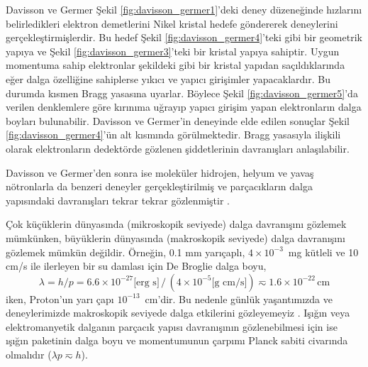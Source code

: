 \documentclass[a4paper,12pt, twoside]{article}
\begin{document}
Davisson ve Germer Şekil \ref{fig:davisson_germer1}'deki deney düzeneğinde hızlarını belirledikleri elektron demetlerini Nikel kristal hedefe göndererek deneylerini gerçekleştirmişlerdir. Bu hedef Şekil \ref{fig:davisson_germer4}'teki gibi bir geometrik yapıya ve Şekil \ref{fig:davisson_germer3}'teki bir kristal yapıya sahiptir. Uygun momentuma sahip elektronlar şekildeki gibi bir kristal yapıdan saçıldıklarında eğer dalga özelliğine sahiplerse yıkıcı ve yapıcı girişimler yapacaklardır. Bu durumda kısmen Bragg yasasına uyarlar. Böylece Şekil \ref{fig:davisson_germer5}'da verilen denklemlere göre kırınıma uğrayıp yapıcı girişim yapan elektronların dalga boyları bulunabilir. Davisson ve Germer'in deneyinde elde edilen sonuçlar Şekil \ref{fig:davisson_germer4}'ün alt kısmında görülmektedir. Bragg yasasıyla ilişkili olarak elektronların dedektörde gözlenen şiddetlerinin davranışları anlaşılabilir.

Davisson ve Germer'den sonra ise moleküler hidrojen, helyum ve yavaş nötronlarla da benzeri deneyler gerçekleştirilmiş ve parçacıkların dalga yapısındaki davranışları tekrar tekrar gözlenmiştir \cite{book:Gasiorowicz}.

Çok küçüklerin dünyasında (mikroskopik seviyede) dalga davranışını gözlemek mümkünken, büyüklerin dünyasında (makroskopik seviyede) dalga davranışını gözlemek mümkün değildir. Örneğin, 0.1 mm yarıçaplı, $4\times 10^{-3}$~mg kütleli ve 10 cm/s ile ilerleyen bir su damlası için De Broglie dalga boyu,
\begin{equation*}
\lambda = h/p = 6.6\times 10^{-27} \text{[erg s]}\,/\,(4\times 10^{-5} \text{[g cm/s]}) \eqsim 1.6\times 10^{-22}\,\text{cm}
\end{equation*}
iken, Proton'un yarı çapı $10^{-13}$~cm'dir. Bu nedenle günlük yaşantımızda ve deneylerimizde makroskopik seviyede dalga etkilerini gözleyemeyiz \cite{book:Gasiorowicz}. Işığın veya elektromanyetik dalganın parçacık yapısı davranışının gözlenebilmesi için ise ışığın paketinin dalga boyu ve momentumunun çarpımı Planck sabiti civarında olmalıdır ($\lambda p \eqsim h$).
\end{document}
